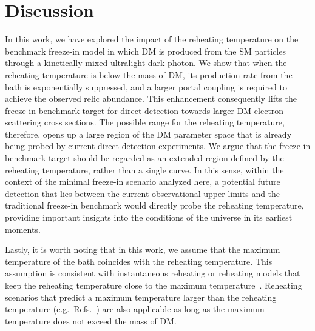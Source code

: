 \section{Discussion}
\label{sec:ch8-discussion}

In this work, we have explored the impact of the reheating temperature on the benchmark freeze-in model in which DM is produced from the SM particles through a kinetically mixed ultralight dark photon. We show that when the reheating temperature is below the mass of DM, its production rate from the bath is exponentially suppressed, and a larger portal coupling is required to achieve the observed relic abundance. This enhancement consequently lifts the freeze-in benchmark target for direct detection towards larger DM-electron scattering cross sections. The possible range for the reheating temperature, therefore, opens up a large region of the DM parameter space that is already being probed by current direct detection experiments. We argue that the freeze-in benchmark target should be regarded as an extended region defined by the reheating temperature, rather than a single curve.  In this sense, within the context of the minimal freeze-in scenario analyzed here, a potential future detection that lies between the current observational upper limits and the traditional freeze-in benchmark would directly probe the reheating temperature, providing important insights into the conditions of the universe in its earliest moments.

Lastly, it is worth noting that in this work, we assume that the maximum temperature of the bath coincides with the reheating temperature. This assumption is consistent with instantaneous reheating or reheating models that keep the reheating temperature close to the maximum temperature~\cite{Co:2020xaf,Cosme:2023xpa,Cosme:2024ndc, Barman:2024mqo}. Reheating scenarios that predict a maximum temperature larger than the reheating temperature (e.g.\ Refs.~\cite{Chung:1998rq,Giudice:2000ex,Kolb:2003ke}) are also applicable as long as the maximum temperature does not exceed the mass of DM.